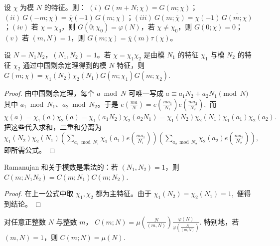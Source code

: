 \documentclass[oneside]{AJbook}
\begin{document}
\begin{theorem}
设 $\chi$ 为模 $N$ 的特征。则：
\((i)\ G(m+N;\chi)=G(m;\chi)\)；\((ii)\ G(-m;\chi)=\overline{\chi}(-1)\,G(m;\chi)\)；\((iii)\ G(m;\overline{\chi})=\chi(-1)\,\overline{G(m;\chi)}\)；\((iv)\) 若 \(\chi=\chi_0\)，则 \(G(0;\chi_0)=\varphi(N)\)，若 \(\chi\ne\chi_0\)，则 \(G(0;\chi)=0\)；\((v)\) 若 \((m,N)=1\)，则 \(G(m;\chi)=\overline{\chi}(m)\tau(\chi)\)。
\end{theorem}

\begin{theorem}[互素模数下的乘法公式]
设 $N=N_1N_2$，$(N_1,N_2)=1$。若
\(
  \chi=\chi_1\chi_2
\)
是由模 $N_1$ 的特征 $\chi_1$ 与模 $N_2$ 的特征 $\chi_2$ 通过中国剩余定理得到的模 $N$ 特征，则
\(
  G(m;\chi)
  =
  \chi_1(N_2)\chi_2(N_1)
  G(m;\chi_1)G(m;\chi_2).
\)
\end{theorem}

\begin{proof}
由中国剩余定理，每个 $a\bmod N$ 可唯一写成
\(
  a\equiv a_1N_2+a_2N_1\pmod N
\)
其中 $a_1\bmod N_1$、$a_2\bmod N_2$。于是
\(
  e\!\left(\frac{ma}{N}\right)
  =
  e\!\left(\frac{ma_1}{N_1}\right)
  e\!\left(\frac{ma_2}{N_2}\right),
\)
而
\(
  \chi(a)
  =
  \chi_1(a)\chi_2(a)
  =
  \chi_1(a_1N_2)\chi_2(a_2N_1)
  =
  \chi_1(N_2)\chi_2(N_1)\chi_1(a_1)\chi_2(a_2).
\)
把这些代入求和，二重和分离为
\(
  \chi_1(N_2)\chi_2(N_1)
  \left(\sum_{a_1\bmod N_1}\chi_1(a_1)e\!\left(\frac{ma_1}{N_1}\right)\right)
  \left(\sum_{a_2\bmod N_2}\chi_2(a_2)e\!\left(\frac{ma_2}{N_2}\right)\right),
\)
即所需公式。
\end{proof}

\begin{corollary}
Ramanujan 和关于模数是乘法的：若 $(N_1,N_2)=1$，则
\(
  C(m;N_1N_2)=C(m;N_1)C(m;N_2).
\)
\end{corollary}

\begin{proof}
在上一公式中取 $\chi_1,\chi_2$ 都为主特征。由于
\(
  \chi_1(N_2)=\chi_2(N_1)=1,
\)
便得到结论。
\end{proof}

\begin{theorem}
对任意正整数 $N$ 与整数 $m$，
\(
  C(m;N)
  =
  \mu\!\left(\frac{N}{(m,N)}\right)
  \frac{\varphi(N)}{\varphi\!\left(\frac{N}{(m,N)}\right)}.
\)
特别地，若 $(m,N)=1$，则
\(
  C(m;N)=\mu(N).
\)
\end{theorem}
\end{document}
